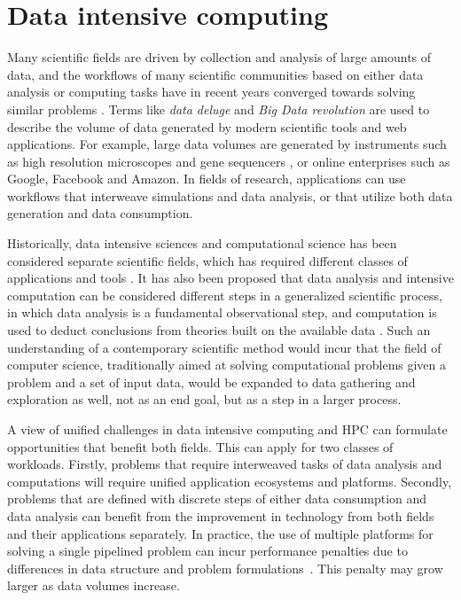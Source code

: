 \documentclass{uit-report}
\begin{document}
\section{Data intensive computing}
Many scientific fields are driven by collection and analysis of large amounts of data, and the workflows of many scientific communities based on either data analysis or computing tasks have in recent years converged towards solving similar problems \cite{bigdataconvergence}. Terms like \emph{data deluge} and \emph{Big Data revolution} are used to describe the volume of data generated by modern scientific tools and web applications. For example, large data volumes are generated by instruments such as high resolution microscopes \cite{microscopy} and gene sequencers \cite{mapreduce_locality}, or online enterprises such as Google, Facebook and Amazon. In fields of research, applications can use workflows that interweave simulations and data analysis, or that utilize both data generation and data consumption. 

Historically, data intensive sciences and computational science has been considered separate scientific fields, which has required different classes of applications and tools \cite{Hey2009JimGO}. It has also been proposed that data analysis and intensive computation can be considered different steps in a generalized scientific process, in which data analysis is a fundamental observational step, and computation is used to deduct conclusions from theories built on the available data \cite{honavar2016accelerating}. Such an understanding of a contemporary scientific method would incur that the field of computer science, traditionally aimed at solving computational problems given a problem and a set of input data, would be expanded to data gathering and exploration as well, not as an end goal, but as a step in a larger process.

A view of unified challenges in data intensive computing and HPC can formulate opportunities that benefit both fields. This can apply for two classes of workloads. Firstly, problems that require interweaved tasks of data analysis and computations will require unified application ecosystems and platforms. Secondly, problems that are defined with discrete steps of either data consumption and data analysis can benefit from the improvement in technology from both fields and their applications separately. In practice, the use of multiple platforms for solving a single pipelined problem can incur performance penalties due to differences in data structure and problem formulations~\cite{husky}. This penalty may grow larger as data volumes increase.
\end{document}
